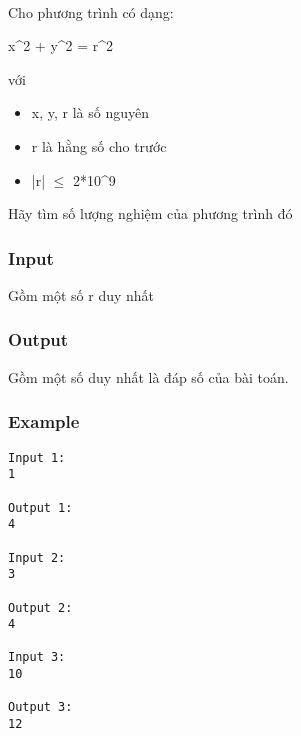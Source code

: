 

 

Cho phương trình có dạng:

x\textasciicircum2 + y\textasciicircum2 = r\textasciicircum2

với
\begin{itemize}
	\item x, y, r là số nguyên
	\item r là hằng số cho trước
	\item |r|  $\le$  2*10\textasciicircum9
\end{itemize}

Hãy tìm số lượng nghiệm của phương trình đó

\subsubsection{Input}

Gồm một số r duy nhất

\subsubsection{Output}

Gồm một số duy nhất là đáp số của bài toán.

\subsubsection{Example}
\begin{verbatim}
Input 1:
1

Output 1:
4

Input 2:
3

Output 2:
4

Input 3:
10

Output 3:
12
\end{verbatim}

